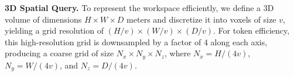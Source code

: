 \smallskip
\noindent
\textbf{3D Spatial Query.}
%
%
To represent the workspace efficiently, we define a 3D volume of dimensions $H \times W \times D$ meters and discretize it into voxels of size $v$, yielding a grid resolution of $(H/v) \times (W/v) \times (D/v)$. For token efficiency, this high-resolution grid is downsampled by a factor of 4 along each axis, producing a coarse grid of size $N_x \times N_y \times N_z$, where $N_x = H/(4v)$, $N_y = W/(4v)$, and $N_z = D/(4v)$.





